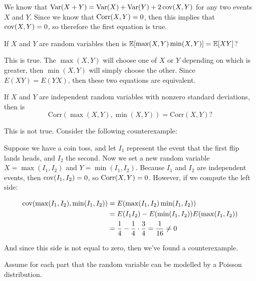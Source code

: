 \documentclass[11pt]{article}
\begin{document}
\begin{Parts}
    \begin{solution}
        We know that $\operatorname{Var}(X + Y) = \operatorname{Var}(X) + \operatorname{Var}(Y) + 2\operatorname{cov}(X, Y)$ for any two events $X$ and $Y$. Since we know that $\operatorname{Corr}(X, Y) = 0$, then this implies that $\operatorname{cov}(X, Y) = 0$, so therefore the first equation is true.
    \end{solution}
	

	\Part If $X$ and $Y$ are random variables then is $\operatorname{\mathbb{E}}[\max (X, Y) \min (X, Y)] = \operatorname{\mathbb{E}}[X Y]$?

    \begin{solution}
        This is true. The $\max(X, Y)$ will choose one of $X$ or $Y$ depending on which is greater, then $\min(X, Y)$ will simply choose the other. Since $E(XY) = E(YX)$, then these two equations are equivalent.
    \end{solution}
	

	\Part If $X$ and $Y$ are independent random variables with nonzero standard deviations, then is $$\text{Corr} (\max (X, Y), \min (X, Y)) = \text{Corr} (X, Y) ?$$

    \begin{solution}
        This is not true. Consider the following counterexample: 

        Suppose we have a coin toss, and let $I_1$ represent the event that the first flip lands heads, and $I_2$ the second. Now we set a new random variable $X = \max(I_1, I_2)$ and $Y = \min(I_1, I_2)$. Because $I_1$ and $I_2$ are independent events, then $\operatorname{cov}(I_1, I_2) = 0$, so $\operatorname{Corr}(X, Y) = 0$. However, if we compute the left side: 

        \begin{align*}
            \operatorname{cov}(\max(I_1, I_2), \min(I_1, I_2)) &= E(\max(I_1, I_2) \min(I_1, I_2))\\
            &= E(I_1I_2) - E(\min(I_1, I_2))E(\max(I_1, I_2))\\
            &= \frac{1}{4} - \frac{1}{4} \cdot \frac{3}{4} = \frac{1}{16} \neq 0 
        \end{align*}

        And since this side is not equal to zero, then we've found a counterexample. 
    \end{solution}
	
\end{Parts}
\pagebreak
{}

Assume for each part that the random variable can be modelled by a Poisson distribution.
\end{document}
